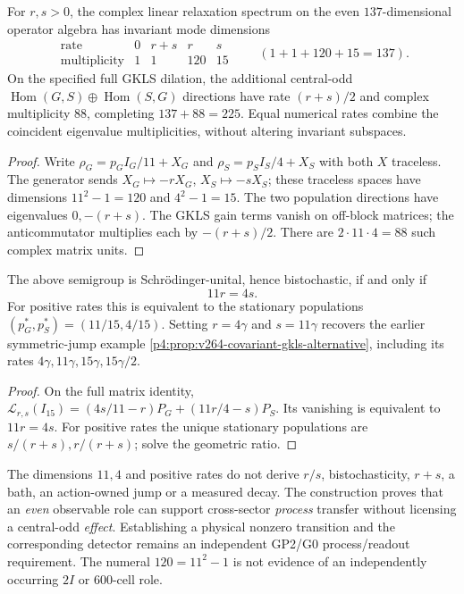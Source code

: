 \documentclass[12pt,a4paper]{article}
\begin{document}
\begin{theorem}
\label{p4a:thm:v352-transfer-spectrum}
For $r,s>0$, the complex linear relaxation spectrum on the even
$137$-dimensional operator algebra has invariant mode dimensions
\[
 \begin{array}{c|rrrr}
\text{rate}&0&r+s&r&s\\\hline
\text{multiplicity}&1&1&120&15
\end{array}
\qquad(1+1+120+15=137).
\]
On the specified full GKLS dilation, the additional central-odd
$\operatorname{Hom}(G,S)\oplus\operatorname{Hom}(S,G)$ directions
have rate $(r+s)/2$ and complex multiplicity $88$, completing
$137+88=225$.  Equal numerical rates combine the coincident
eigenvalue multiplicities, without altering invariant subspaces.
\end{theorem}
\begin{proof}
Write $\rho_G=p_G I_G/11+X_G$ and
$\rho_S=p_S I_S/4+X_S$ with both $X$ traceless.
The generator sends $X_G\mapsto-rX_G$, $X_S\mapsto-sX_S$;
these traceless spaces have dimensions $11^2-1=120$ and
$4^2-1=15$.  The two population directions have eigenvalues
$0,-(r+s)$.  The GKLS gain terms vanish on off-block matrices;
the anticommutator multiplies each by $-(r+s)/2$.
There are $2\cdot11\cdot4=88$ such complex matrix units.
\end{proof}

\begin{corollary}
\label{p4a:cor:v352-transfer-bistochastic}
The above semigroup is Schr\"odinger-unital, hence bistochastic,
if and only if
\[
 \boxed{11r=4s}.
\]
For positive rates this is equivalent to the stationary populations
$(p_G^*,p_S^*)=(11/15,4/15)$.  Setting
$r=4\gamma$ and $s=11\gamma$ recovers the earlier symmetric-jump
example \ref{p4:prop:v264-covariant-gkls-alternative}, including
its rates $4\gamma,11\gamma,15\gamma,15\gamma/2$.
\end{corollary}
\begin{proof}
On the full matrix identity,
$\mathcal L_{r,s}(I_{15})=
 (4s/11-r)P_G+(11r/4-s)P_S$.
Its vanishing is equivalent to $11r=4s$.
For positive rates the unique stationary populations are
$s/(r+s),r/(r+s)$; solve the geometric ratio.
\end{proof}

\begin{remark}
\label{p4a:rem:v352-transfer-physical-frontier}
The dimensions $11,4$ and positive rates do not derive
$r/s$, bistochasticity, $r+s$, a bath, an action-owned jump or a
measured decay.  The construction proves that an \emph{even}
observable role can support cross-sector \emph{process} transfer
without licensing a central-odd \emph{effect}.  Establishing a
physical nonzero transition and the corresponding detector remains
an independent GP2/G0 process/readout requirement.  The numeral
$120=11^2-1$ is not evidence of an independently occurring
$2I$ or 600-cell role.
\end{remark}
\end{document}
